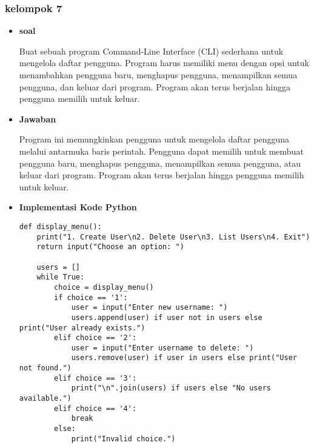 \documentclass[12pt]{article}
\begin{document}
\subsubsection{kelompok 7}
\begin{itemize}
    \item\textbf{soal}
\par\hspace{2em}Buat sebuah program Command-Line Interface (CLI) sederhana untuk mengelola daftar pengguna. Program harus memiliki menu dengan opsi untuk menambahkan pengguna baru, menghapus pengguna, menampilkan semua pengguna, dan keluar dari program. Program akan terus berjalan hingga pengguna memilih untuk keluar.

    \item\textbf{Jawaban}
\par\hspace{2em}Program ini memungkinkan pengguna untuk mengelola daftar pengguna melalui antarmuka baris perintah. Pengguna dapat memilih untuk membuat pengguna baru, menghapus pengguna, menampilkan semua pengguna, atau keluar dari program. Program akan terus berjalan hingga pengguna memilih untuk keluar.

    \item\textbf{Implementasi Kode Python}

        \lstset{style=mystyle}
    \begin{lstlisting}def display_menu():
    print("1. Create User\n2. Delete User\n3. List Users\n4. Exit")
    return input("Choose an option: ")

    users = []
    while True:
        choice = display_menu()
        if choice == '1':
            user = input("Enter new username: ")
            users.append(user) if user not in users else print("User already exists.")
        elif choice == '2':
            user = input("Enter username to delete: ")
            users.remove(user) if user in users else print("User not found.")
        elif choice == '3':
            print("\n".join(users) if users else "No users available.")
        elif choice == '4':
            break
        else:
            print("Invalid choice.")
         \end{lstlisting}
\end{itemize}
\end{document}
